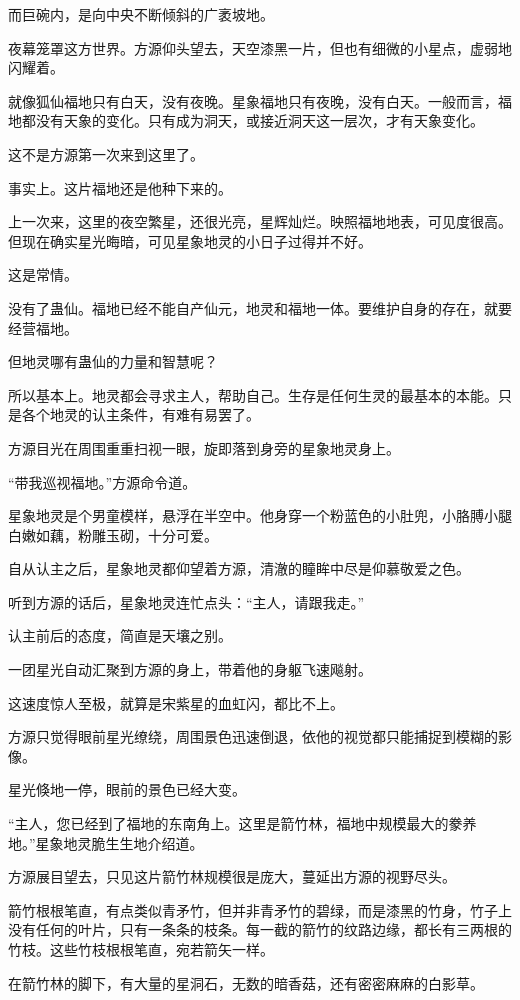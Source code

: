 \begin{this_body}
而巨碗内，是向中央不断倾斜的广袤坡地。

夜幕笼罩这方世界。方源仰头望去，天空漆黑一片，但也有细微的小星点，虚弱地闪耀着。

就像狐仙福地只有白天，没有夜晚。星象福地只有夜晚，没有白天。一般而言，福地都没有天象的变化。只有成为洞天，或接近洞天这一层次，才有天象变化。

这不是方源第一次来到这里了。

事实上。这片福地还是他种下来的。

上一次来，这里的夜空繁星，还很光亮，星辉灿烂。映照福地地表，可见度很高。但现在确实星光晦暗，可见星象地灵的小日子过得并不好。

这是常情。

没有了蛊仙。福地已经不能自产仙元，地灵和福地一体。要维护自身的存在，就要经营福地。

但地灵哪有蛊仙的力量和智慧呢？

所以基本上。地灵都会寻求主人，帮助自己。生存是任何生灵的最基本的本能。只是各个地灵的认主条件，有难有易罢了。

方源目光在周围重重扫视一眼，旋即落到身旁的星象地灵身上。

“带我巡视福地。”方源命令道。

星象地灵是个男童模样，悬浮在半空中。他身穿一个粉蓝色的小肚兜，小胳膊小腿白嫩如藕，粉雕玉砌，十分可爱。

自从认主之后，星象地灵都仰望着方源，清澈的瞳眸中尽是仰慕敬爱之色。

听到方源的话后，星象地灵连忙点头：“主人，请跟我走。”

认主前后的态度，简直是天壤之别。

一团星光自动汇聚到方源的身上，带着他的身躯飞速飚射。

这速度惊人至极，就算是宋紫星的血虹闪，都比不上。

方源只觉得眼前星光缭绕，周围景色迅速倒退，依他的视觉都只能捕捉到模糊的影像。

星光倏地一停，眼前的景色已经大变。

“主人，您已经到了福地的东南角上。这里是箭竹林，福地中规模最大的豢养地。”星象地灵脆生生地介绍道。

方源展目望去，只见这片箭竹林规模很是庞大，蔓延出方源的视野尽头。

箭竹根根笔直，有点类似青矛竹，但并非青矛竹的碧绿，而是漆黑的竹身，竹子上没有任何的叶片，只有一条条的枝条。每一截的箭竹的纹路边缘，都长有三两根的竹枝。这些竹枝根根笔直，宛若箭矢一样。

在箭竹林的脚下，有大量的星洞石，无数的暗香菇，还有密密麻麻的白影草。


\end{this_body}

